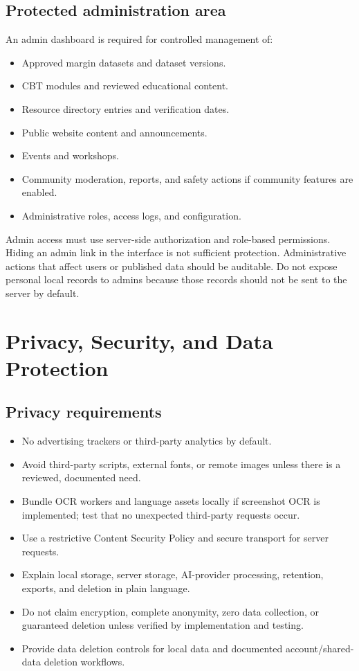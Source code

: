 \documentclass[11pt,a4paper]{article}
\begin{document}
\subsection{Protected administration area}
An admin dashboard is required for controlled management of:
\begin{itemize}
  \item Approved margin datasets and dataset versions.
  \item CBT modules and reviewed educational content.
  \item Resource directory entries and verification dates.
  \item Public website content and announcements.
  \item Events and workshops.
  \item Community moderation, reports, and safety actions if community features are enabled.
  \item Administrative roles, access logs, and configuration.
\end{itemize}
Admin access must use server-side authorization and role-based permissions. Hiding an admin link in the interface is not sufficient protection. Administrative actions that affect users or published data should be auditable. Do not expose personal local records to admins because those records should not be sent to the server by default.

\section{Privacy, Security, and Data Protection}

\subsection{Privacy requirements}
\begin{itemize}
  \item No advertising trackers or third-party analytics by default.
  \item Avoid third-party scripts, external fonts, or remote images unless there is a reviewed, documented need.
  \item Bundle OCR workers and language assets locally if screenshot OCR is implemented; test that no unexpected third-party requests occur.
  \item Use a restrictive Content Security Policy and secure transport for server requests.
  \item Explain local storage, server storage, AI-provider processing, retention, exports, and deletion in plain language.
  \item Do not claim encryption, complete anonymity, zero data collection, or guaranteed deletion unless verified by implementation and testing.
  \item Provide data deletion controls for local data and documented account/shared-data deletion workflows.
\end{itemize}
\end{document}
